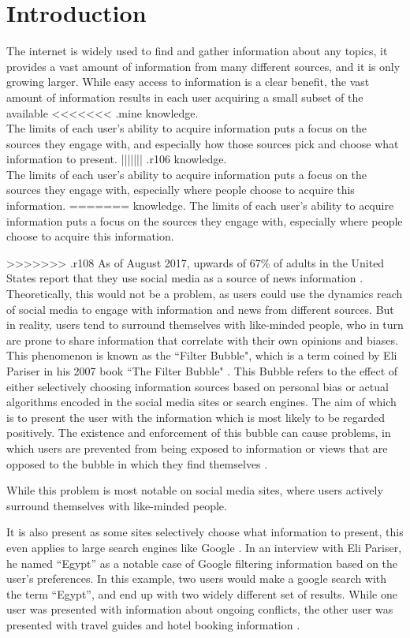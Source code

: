 \chapter{Introduction}
The internet is widely used to find and gather information about any topics, it
provides a vast amount of information from many different sources, and it is
only growing larger.
While easy access to information is a clear benefit, the vast amount of
information results in each user acquiring a small subset of the available
<<<<<<< .mine
knowledge.\\
The limits of each user's ability to acquire information puts a focus on the
sources they engage with, and especially how those sources pick and choose what
information to present.
||||||| .r106
knowledge.\\
The limits of each user's ability to acquire information puts a focus on the
sources they engage with, especially where people choose to acquire this
information.
=======
knowledge. The limits of each user's ability to acquire information puts a focus
on the sources they engage with, especially where people choose to acquire this
information.\nl

>>>>>>> .r108
As of August 2017, upwards of 67\% of adults in the United States report that
they use social media as a source of news information \citep{journalism2017}.
Theoretically, this would not be a problem, as users could use the dynamics
reach of social media to engage with information and news from different sources.
But in reality, users tend to surround themselves with like-minded people, who
in turn are prone to share information that correlate with their own opinions
and biases.\\

This phenomenon is known as the ``Filter Bubble", which is a term coined by Eli
Pariser in his 2007 book ``The Filter Bubble" \citep{pariser2011filter}.
This Bubble refers to the effect of either selectively choosing information
sources based on personal bias or actual algorithms encoded in the social media
sites or search engines.
The aim of which is to present the user with the information which is most
likely to be regarded positively.
The existence and enforcement of this bubble can cause problems, in which users
are prevented from being exposed to information or views that are opposed to the
bubble in which they find themselves \citep[p.59-73]{pariser2011filter}.\nl

While this problem is most notable on social media sites, where users actively
surround themselves with like-minded people.

It is also present as some sites selectively choose what information to present,
this even applies to large search engines like Google \citep{filterBubbleDef}.
In an interview with Eli Pariser, he named ``Egypt'' as a notable case of
Google filtering information based on the user's preferences.
In this example, two users would make a google search with the term ``Egypt'',
and end up with two widely different set of results.
While one user was presented with information about ongoing conflicts, the other
user was presented with travel guides and hotel booking information
\citep{nusSduSearch}.